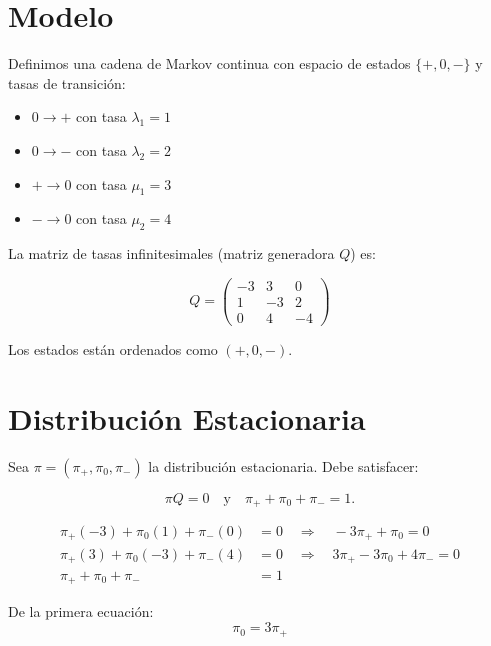 \documentclass[10pt]{article}
\begin{document}
\section*{Modelo}

Definimos una cadena de Markov continua con espacio de estados $\{+, 0, -\}$ y tasas de transición:

\begin{itemize}
    \item $0 \to +$ con tasa $\lambda_1 = 1$
    \item $0 \to -$ con tasa $\lambda_2 = 2$
    \item $+ \to 0$ con tasa $\mu_1 = 3$
    \item $- \to 0$ con tasa $\mu_2 = 4$
\end{itemize}

\bigskip

La matriz de tasas infinitesimales (matriz generadora $Q$) es:

\begin{equation*}
Q =
\begin{pmatrix}
-3 & 3 & 0 \\
1 & -3 & 2 \\
0 & 4 & -4
\end{pmatrix}
\end{equation*}

Los estados están ordenados como $(+, 0, -)$.

\section*{Distribución Estacionaria}

Sea $\pi = (\pi_+, \pi_0, \pi_-)$ la distribución estacionaria. Debe satisfacer:

\begin{equation*}
\pi Q = 0 \quad \text{y} \quad \pi_+ + \pi_0 + \pi_- = 1.
\end{equation*}

\begin{align*}
\pi_+(-3) + \pi_0(1) + \pi_-(0) &= 0 \quad \Rightarrow \quad -3\pi_+ + \pi_0 = 0 \\
\pi_+(3) + \pi_0(-3) + \pi_-(4) &= 0 \quad \Rightarrow \quad 3\pi_+ -3\pi_0 + 4\pi_- = 0 \\
\pi_+ + \pi_0 + \pi_- &= 1
\end{align*}

De la primera ecuación:
\begin{equation*}
\pi_0 = 3\pi_+
\end{equation*}
\end{document}
